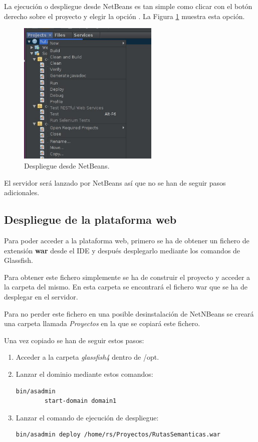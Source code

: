 La ejecución o despliegue desde NetBeans es tan simple como clicar con el botón derecho sobre el proyecto y elegir la opción . La Figura \ref{netbeansrun} muestra esta opción.

\begin{figure}[h]
  \centering
    \includegraphics[width=0.6\textwidth]{../img/glass/netbeansrun.jpg}
  \caption{Despliegue desde NetBeans.}
  \label{netbeansrun}
\end{figure}

El servidor será lanzado por NetBeans así que no se han de seguir pasos adicionales.

\subsection{Despliegue de la plataforma web}
Para poder acceder a la plataforma web, primero se ha de obtener un fichero de extensión \textbf{war} desde el IDE y después desplegarlo mediante los comandos de Glassfish.

Para obtener este fichero simplemente se ha de construir el proyecto y acceder a la carpeta  del mismo. En esta carpeta se encontrará el fichero war que se ha de desplegar en el servidor.

Para no perder este fichero en una posible desinstalación de NetNBeans se creará una carpeta llamada \textit{Proyectos} en la que se copiará este fichero.

Una vez copiado se han de seguir estos pasos:

\begin{enumerate}
	\item Acceder a la carpeta \textit{glassfish4} dentro de /opt.
	\item Lanzar el dominio mediante estos comandos:
	\begin{lstlisting}[language=bash]
		bin/asadmin
		start-domain domain1		
	\end{lstlisting}
	\item Lanzar el comando de ejecución de despliegue:
	\begin{lstlisting}[language=bash]
		bin/asadmin deploy /home/rs/Proyectos/RutasSemanticas.war
	\end{lstlisting}
\end{enumerate}

